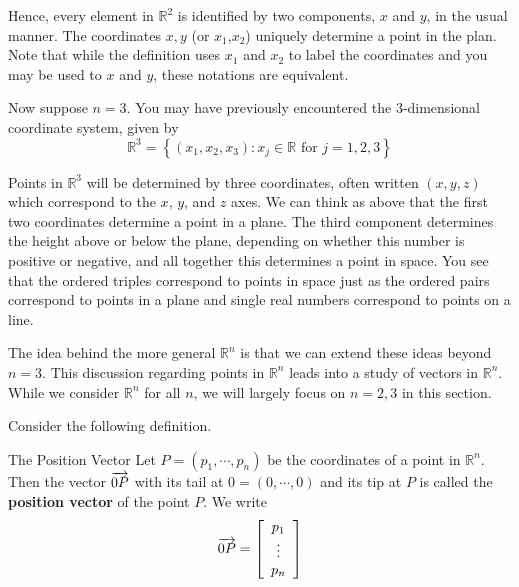 Hence, every element in $\mathbb{R}^2$ is identified by two
components, $x$ and $y$, in the usual manner. The coordinates $x, y$ (or $x_1$,$x_2$) uniquely determine a point in the plan. Note that while the definition uses $x_1$ and $x_2$ to label the coordinates and you may be used to $x$ and $y$, these notations are equivalent. 

Now suppose $n=3$. You may have previously encountered the $3$-dimensional
coordinate system, given by
\begin{equation*}
\mathbb{R}^{3}=
\left\{ \left( x_{1}, x_{2}, x_{3}\right)
:x_{j}\in \mathbb{R}\text{ for }j=1,2,3 \right\}
\end{equation*}

Points in $\mathbb{R}^3$ will be determined by three
coordinates, often written $\left(x,y,z\right)$ which correspond to the $x$, $y$,
and $z$ axes.  We can think as above that the first two coordinates
determine a point in a plane. The third component determines the
height above or below the plane, depending on whether this number is
positive or negative, and all together this determines a point in
space. You
see that the ordered triples correspond to points in space just as the
ordered pairs correspond to points in a plane and single real numbers
correspond to points on a line.

The idea behind the more general $\mathbb{R}^n$ is that we can extend
these ideas beyond $n = 3.$ This discussion regarding points in $\mathbb{R}^n$ leads into a study of vectors in $\mathbb{R}^n$. While we consider $\mathbb{R}^n$ for all $n$,
we will largely  focus on $n=2,3$ in this section. 

Consider the following definition.

\begin{definition}{The Position Vector}\label{def:positionvector}
Let $P=\left( p_{1},\cdots ,p_{n}\right) $ be the coordinates of a
point in $\mathbb{R}^{n}.$ Then the vector $\overrightarrow{0P}$ with its tail at
$0=\left( 0,\cdots ,0\right) $ and its tip at 
$P$ is called the \textbf{position vector }of
  the point $P$. 
We write 
\begin{equation*}
\overrightarrow{0P} = \left[ 
\begin{array}{c}
p_{1} \\
\vdots \\
p_{n}
\end{array} \right]
\end{equation*}
\end{definition}

